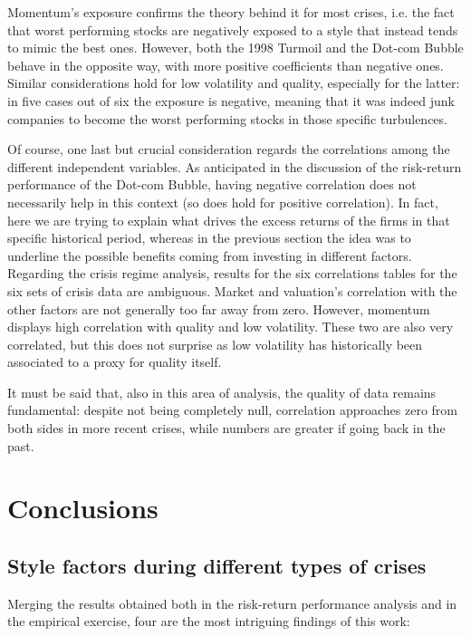 \documentclass[12pt]{article}
\begin{document}
Momentum's exposure confirms the theory behind it for most crises, i.e. the fact that worst performing stocks are negatively exposed to a style that instead tends to mimic the best ones. However, both the 1998 Turmoil and the Dot-com Bubble behave in the opposite way, with more positive coefficients than negative ones. Similar considerations hold for low volatility and quality, especially for the latter: in five cases out of six the exposure is negative, meaning that it was indeed junk companies to become the worst performing stocks in those specific turbulences.

Of course, one last but crucial consideration regards the correlations among the different independent variables. As anticipated in the discussion of the risk-return performance of the Dot-com Bubble, having negative correlation does not necessarily help in this context (so does hold for positive correlation). In fact, here we are trying to explain what drives the excess returns of the firms in that specific historical period, whereas in the previous section the idea was to underline the possible benefits coming from investing in different factors. Regarding the crisis regime analysis, results for the six correlations tables for the six sets of crisis data are ambiguous. Market and valuation's correlation with the other factors are not generally too far away from zero. However, momentum displays high correlation with quality and low volatility. These two are also very correlated, but this does not surprise as low volatility has historically been associated to a proxy for quality itself.

It must be said that, also in this area of analysis, the quality of data remains fundamental: despite not being completely null, correlation approaches zero from both sides in more recent crises, while numbers are greater if going back in the past.

\newpage
\section{Conclusions}

\subsection{Style factors during different types of crises}

Merging the results obtained both in the risk-return performance analysis and in the empirical exercise, four are the most intriguing findings of this work:
\end{document}
